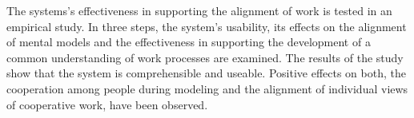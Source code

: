 The systems's effectiveness in supporting the alignment of work is tested in an empirical study. In three steps, the system's usability, its effects on the alignment of mental models and the effectiveness in supporting the development of a common understanding of work processes are examined. The results of the study show that the system is comprehensible and useable. Positive effects on both, the cooperation among people during modeling and the alignment of individual views of cooperative work, have been observed.